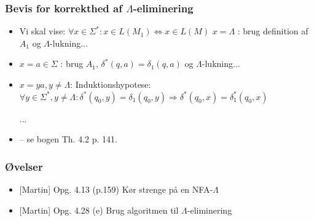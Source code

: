 \begin{frame}
\frametitle{Bevis for korrekthed af $\Lambda $-eliminering}
\begin{itemize}[<+->]
\item Vi skal vise:  $\forall x\in \Sigma^*: x \in L(M_1) \Leftrightarrow x\in L(M)$
$x=\Lambda$ : brug definition af $A_1$ og $\Lambda$-lukning...
\item $x=a \in \Sigma$ : brug $A_1$, $\delta^*(q,a)=\delta_1(q,a)$ og $\Lambda$-lukning...
\item
$x = ya, y\neq \Lambda$:
Induktionshypotese:  $\forall y\in \Sigma^*, y\neq \Lambda :  \delta^*(q_0, y) = \delta_1(q_0, y)
\Rightarrow \delta^*(q_0, x) = \delta_1^*(q_0, x)$

...

\item
– se bogen Th. 4.2 p. 141.
\end{itemize}
\end{frame}
\begin{frame}
\frametitle{Øvelser}
\begin{itemize}
\item{} [Martin] Opg. 4.13 (p.159)
Kør strenge på en NFA-$\Lambda$
\item{} [Martin] Opg. 4.28 (e)
Brug algoritmen til $\Lambda$-eliminering
\end{itemize}
\end{frame}


